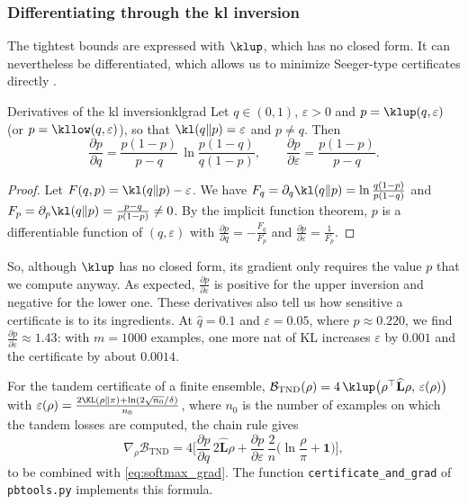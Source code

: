 \subsubsection{Differentiating through the kl inversion}

The tightest bounds are expressed with $\klup$, which has no closed form. It
can nevertheless be differentiated, which allows us to minimize Seeger-type
certificates directly \citep{reeb2018learning,viallard2021self}.

\begin{proposition}{Derivatives of the kl inversion}{klgrad}
Let $q\in(0,1)$, $\varepsilon>0$ and $p=\klup(q,\varepsilon)$ (or $p=\kllow(q,\varepsilon)$), so that
$\kl(q\|p)=\varepsilon$ and $p\neq q$. Then
\[
\frac{\partial p}{\partial q}=\frac{p(1-p)}{p-q}\,\ln\frac{p(1-q)}{q(1-p)},
\qquad
\frac{\partial p}{\partial\varepsilon}=\frac{p(1-p)}{p-q}.
\]
\end{proposition}
\begin{proof}
Let $F(q,p)=\kl(q\|p)-\varepsilon$. We have $F_q=\partial_q\kl(q\|p)=\ln\frac{q(1-p)}{p(1-q)}$
and $F_p=\partial_p\kl(q\|p)=\frac{p-q}{p(1-p)}\neq0$. By the implicit function theorem,
$p$ is a differentiable function of $(q,\varepsilon)$ with $\frac{\partial p}{\partial q}=-\frac{F_q}{F_p}$
and $\frac{\partial p}{\partial\varepsilon}=\frac{1}{F_p}$.
\end{proof}

So, although $\klup$ has no closed form, its gradient only requires the value
$p$ that we compute anyway. As expected, $\frac{\partial p}{\partial\varepsilon}$
is positive for the upper inversion and negative for the lower one. These
derivatives also tell us how
sensitive a certificate is to its ingredients. At $\hat q=0.1$ and $\varepsilon=0.05$,
where $p\approx0.220$, we find $\frac{\partial p}{\partial\varepsilon}\approx1.43$: with $m=1000$
examples, one more nat of KL increases $\varepsilon$ by $0.001$ and the certificate by
about $0.0014$.

For the tandem certificate of a finite ensemble,
$\mathcal B_{\mathrm{TND}}(\rho)=4\,\klup\big(\rho^\top\widehat{\mathbf L}\rho,\,\varepsilon(\rho)\big)$ with
$\varepsilon(\rho)=\frac{2\KL(\rho\|\pi)+\ln(2\sqrt{n_0}/\delta)}{n_0}$, where $n_0$ is the number of examples on which the tandem losses are computed, the chain rule gives
\begin{equation}\label{eq:grad_tnd_cert}
\nabla_\rho\mathcal B_{\mathrm{TND}}=4\Big[\frac{\partial p}{\partial q}\,2\widehat{\mathbf L}\rho+\frac{\partial p}{\partial\varepsilon}\,\frac2n\Big(\ln\frac\rho\pi+\mathbf 1\Big)\Big],
\end{equation}
to be combined with \eqref{eq:softmax_grad}. The function
\texttt{certificate\_and\_grad} of \texttt{pbtools.py} implements this formula.

